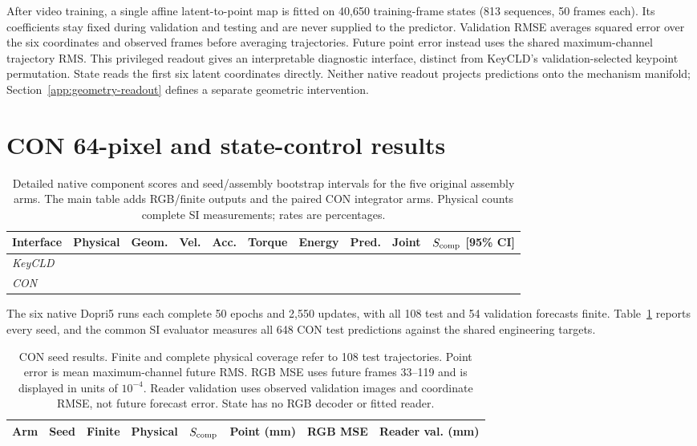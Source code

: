 \documentclass[10pt,twocolumn,letterpaper]{article}
\begin{document}
After video training, a single affine latent-to-point map is fitted on 40,650 training-frame states (813 sequences, 50 frames each). Its coefficients stay fixed during validation and testing and are never supplied to the predictor. Validation RMSE averages squared error over the six coordinates and observed frames before averaging trajectories. Future point error instead uses the shared maximum-channel trajectory RMS. This privileged readout gives an interpretable diagnostic interface, distinct from KeyCLD's validation-selected keypoint permutation. State reads the first six latent coordinates directly. Neither native readout projects predictions onto the mechanism manifold; Section~\ref{app:geometry-readout} defines a separate geometric intervention.

\section{CON 64-pixel and state-control results}
\begin{table}[t]
\caption{Detailed native component scores and seed/assembly bootstrap intervals for the five original assembly arms. The main table adds RGB/finite outputs and the paired CON integrator arms. Physical counts complete SI measurements; rates are percentages.}
\centering\small
\begin{tabular}{lrrrrrrrrl}
\toprule
Interface & Physical & Geom. & Vel. & Acc. & Torque & Energy & Pred. & Joint & $S_{\rm comp}$ [95\% CI]\\
\midrule
\multicolumn{10}{l}{\textit{KeyCLD}}\\

\midrule
\multicolumn{10}{l}{\textit{CON}}\\

\bottomrule
\end{tabular}
\end{table}

\label{app:con-results}
The six native Dopri5 runs each complete 50 epochs and 2,550 updates, with all 108 test and 54 validation forecasts finite. Table~\ref{app:con-seeds} reports every seed, and the common SI evaluator measures all 648 CON test predictions against the shared engineering targets.

\begin{table}[t]
\caption{CON seed results. Finite and complete physical coverage refer to 108 test trajectories. Point error is mean maximum-channel future RMS. RGB MSE uses future frames 33--119 and is displayed in units of $10^{-4}$. Reader validation uses observed validation images and coordinate RMSE, not future forecast error. State has no RGB decoder or fitted reader.}
\label{app:con-seeds}
\centering\small
\begin{tabular}{lrrrrrrr}
\toprule
Arm & Seed & Finite & Physical & $S_{\rm comp}$ & Point (mm) & RGB MSE & Reader val. (mm)\\
\midrule

\bottomrule
\end{tabular}
\end{table}
\end{document}
